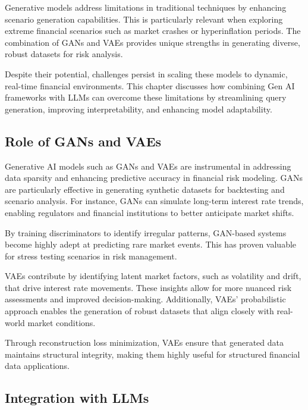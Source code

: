 \documentclass[a4paper,headinclude=on,footinclude=on,12pt,oneside]{scrbook}
\begin{document}
	Generative models address limitations in traditional techniques by enhancing scenario generation capabilities. This is particularly relevant when exploring extreme financial scenarios such as market crashes or hyperinflation periods. The combination of GANs and VAEs provides unique strengths in generating diverse, robust datasets for risk analysis.
	
	Despite their potential, challenges persist in scaling these models to dynamic, real-time financial environments. This chapter discusses how combining Gen AI frameworks with LLMs can overcome these limitations by streamlining query generation, improving interpretability, and enhancing model adaptability.
	
	
	\subsection{Role of GANs and VAEs}
	
	Generative AI models such as GANs and VAEs are instrumental in addressing data sparsity and enhancing predictive accuracy in financial risk modeling. GANs are particularly effective in generating synthetic datasets for backtesting and scenario analysis. For instance, GANs can simulate long-term interest rate trends, enabling regulators and financial institutions to better anticipate market shifts.
	
	By training discriminators to identify irregular patterns, GAN-based systems become highly adept at predicting rare market events. This has proven valuable for stress testing scenarios in risk management.
	
	VAEs contribute by identifying latent market factors, such as volatility and drift, that drive interest rate movements. These insights allow for more nuanced risk assessments and improved decision-making. Additionally, VAEs’ probabilistic approach enables the generation of robust datasets that align closely with real-world market conditions.
	
	Through reconstruction loss minimization, VAEs ensure that generated data maintains structural integrity, making them highly useful for structured financial data applications.
	
	\subsection{Integration with LLMs}
	
\end{document}
